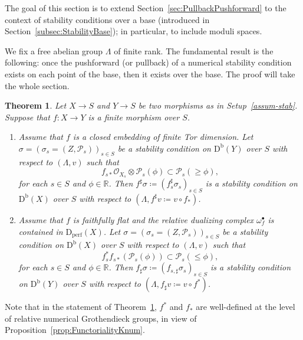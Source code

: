 \documentclass[11pt, reqno]{amsart}
\numberwithin{equation}{section}
\theoremstyle{plain}
\newtheorem{theorem}{Theorem}[section]
\theoremstyle{remark}
\theoremstyle{definition}
\theoremstyle{italicsname}
\newcommand{\Db}{\mathrm{D^b}}
\newcommand{\Dperf}{\mathrm{D}_{\mathrm{perf}}}
\newcommand{\cO}{\mathcal{O}}
\newcommand{\cP}{\mathscr{P}}
\def\RR{\ensuremath{\mathbb{R}}}
\begin{document}
The goal of this section is to extend Section~\ref{sec:PullbackPushforward} to the context of stability conditions over a base (introduced in Section~\ref{subsec:StabilityBase}); in particular, to include moduli spaces.

We fix a free abelian group $\Lambda$ of finite rank.
The fundamental result is the following: once the pushforward (or pullback) of a numerical stability condition exists on each point of the base, then it exists over the base. 
The proof will take the whole section.

\begin{theorem}\label{thm:main-criterion}
Let $X\to S$ and $Y\to S$ be two morphisms as in Setup~\ref{assum-stab}.
Suppose that $f\colon X\to Y$ is a finite morphism over $S$.
\begin{enumerate}[{\rm (1)}]
\item\label{enum:main-criterion1} Assume that $f$ is a closed embedding of finite Tor dimension. Let ${\sigma}=(\sigma_s=(Z, \cP_s))_{s\in S}$ be a stability condition on $\Db(Y)$ over $S$ with respect to $(\Lambda,v)$ such that
\begin{equation}\label{eq:push}
    f_{s*} \cO_{X_s} \otimes \cP_{s}(\phi)\subset\cP_{s}(\geq \phi),
\end{equation}
for each $s\in S$ and $\phi\in\RR$. 
Then $f^{\sharp}{\sigma}\coloneqq(f_s^{\sharp}\sigma_s)_{s\in S}$ is a stability condition on $\Db(X)$ over $S$ with respect to $(\Lambda,f^{\sharp}v\coloneqq v\circ f_*)$.
\item\label{enum:main-criterion2} 
Assume that $f$ is faithfully flat and the relative dualizing complex $\omega_{f}^{\bullet}$ is contained in $\Dperf(X)$. 
Let ${\sigma}=(\sigma_s=(Z,\cP_s))_{s\in S}$ be a stability condition on $\Db(X)$ over $S$ with respect to $(\Lambda,v)$ such that 
\begin{equation}\label{eq:pullback}
    f^*_s f_{s*}(\cP_{s}(\phi))\subset\cP_{s}(\leq \phi),
\end{equation}
for each $s\in S$ and $\phi\in\RR$.
Then $f_{\sharp}{\sigma}\coloneqq(f_{s,\sharp}\sigma_s)_{s\in S}$ is a stability condition on $\Db(Y)$ over $S$ with respect to $(\Lambda,f_{\sharp}v\coloneqq v\circ f^*)$.
\end{enumerate}
\end{theorem}

Note that in the statement of Theorem~\ref{thm:main-criterion}, $f^*$ and $f_*$ are well-defined at the level of relative numerical Grothendieck groups, in view of Proposition~\ref{prop:FunctorialityKnum}.
\end{document}

